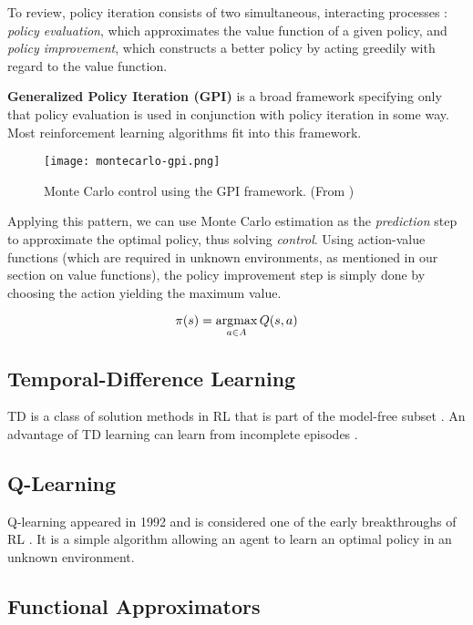 To review, policy iteration consists of two simultaneous, interacting processes \cite{rlai}: \emph{policy evaluation}, which approximates the value function of a given policy, and \emph{policy improvement}, which constructs a better policy by acting greedily with regard to the value function.

\textbf{Generalized Policy Iteration (GPI)} is a broad framework specifying only that policy evaluation is used in conjunction with policy iteration in some way.
Most reinforcement learning algorithms fit into this framework.

\begin{figure}[h]
    \texttt{[image: montecarlo-gpi.png]}
    \centering
    \caption{Monte Carlo control using the GPI framework. (From \cite{rlai})}
\end{figure}

Applying this pattern, we can use Monte Carlo estimation as the \emph{prediction} step to approximate the optimal policy, thus solving \emph{control}.
Using action-value functions (which are required in unknown environments, as mentioned in our section on value functions), the policy improvement step is simply done by choosing the action yielding the maximum value.

\begin{equation}
    \pi(s) = \operatorname*{\arg\!\max}_{a \in A}{Q(s, a)}
\end{equation}

\subsection{Temporal-Difference Learning} \label{rl:td}
TD is a class of solution methods in RL that is part of the model-free subset \cite{rlai}.
An advantage of TD learning can learn from incomplete episodes \cite{long-peak-rl}.

\subsection{Q-Learning} \label{rl:q-learning}
Q-learning \cite{Watkins1992} appeared in 1992 and is considered one of the early breakthroughs of RL \cite{rlai}.
It is a simple algorithm allowing an agent to learn an optimal policy in an unknown environment.

\subsection{Functional Approximators}